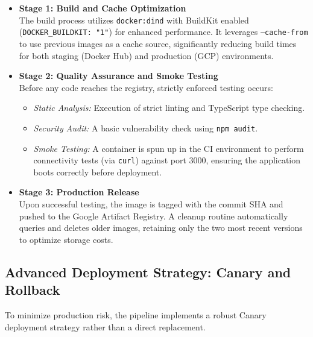 \documentclass[a4paper,12pt]{report}
\begin{document}
\begin{itemize}
    \item \textbf{Stage 1: Build and Cache Optimization} \\
    The build process utilizes \texttt{docker:dind} with BuildKit enabled \\ (\texttt{DOCKER\_BUILDKIT: "1"}) for enhanced performance. It leverages \texttt{--cache-from} to use previous images as a cache source, significantly reducing build times for both staging (Docker Hub) and production (GCP) environments.

    \item \textbf{Stage 2: Quality Assurance and Smoke Testing} \\
    Before any code reaches the registry, strictly enforced testing occurs:
    \begin{itemize}[label=-]
        \item \textit{Static Analysis:} Execution of strict linting and TypeScript type checking.
        \item \textit{Security Audit:} A basic vulnerability check using \texttt{npm audit}.
        \item \textit{Smoke Testing:} A container is spun up in the CI environment to perform connectivity tests (via \texttt{curl}) against port 3000, ensuring the application boots correctly before deployment.
    \end{itemize}

    \item \textbf{Stage 3: Production Release} \\
    Upon successful testing, the image is tagged with the commit SHA and pushed to the Google Artifact Registry. A cleanup routine automatically queries and deletes older images, retaining only the two most recent versions to optimize storage costs.
\end{itemize}

\subsection{Advanced Deployment Strategy: Canary and Rollback}
To minimize production risk, the pipeline implements a robust Canary deployment strategy rather than a direct replacement.
\end{document}
